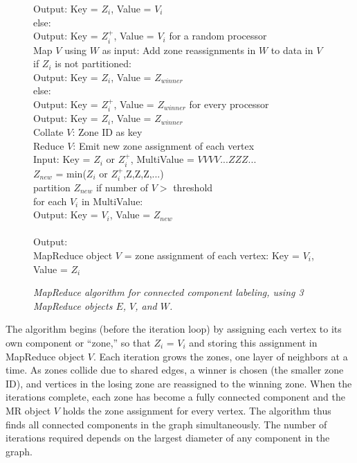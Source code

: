 \begin{figure}[htb]
\begin{center}
{\begin{minipage}{\textwidth}
\begin{tabbing}
    \> \> \> Output: Key = $Z_i$, Value = $V_i$ \\
    \> \> else: \\
    \> \> \> Output: Key = $Z_i^+$, Value = $V_i$ for a random processor \\
 Map $V$ using $W$ as input: Add zone reassignments in $W$ to data in $V$ \\
    \> \> if $Z_i$ is not partitioned: \\
    \> \> \> Output: Key = $Z_i$, Value = $Z_{winner}$ \\
    \> \> else: \\
    \> \> \> Output: Key = $Z_i^+$, Value = $Z_{winner}$ for every processor \\
    \> \> \> Output: Key = $Z_i$, Value = $Z_{winner}$ \\
 Collate $V$: Zone ID as key \\
 Reduce $V$: Emit new zone assignment of each vertex \\
       \> \> Input: Key = $Z_i$ or $Z_i^+$, MultiValue = $V V V V ... Z Z Z ...$ \\
       \> \> $Z_{new}$ = min($Z_i$ or $Z_i^+$,Z,Z,Z,...) \\
       \> \> partition $Z_{new}$ if number of $V >$ threshold \\
       \> \> for each $V_i$ in MultiValue: \\
       \> \> \> Output: Key = $V_i$, Value = $Z_{new}$ \\
\\
Output: \\
\> MapReduce object $V$ = zone assignment of each vertex: Key = $V_i$, Value = $Z_i$ 
  \end{tabbing}
 \end{minipage}}\end{center}

 \caption{\it MapReduce algorithm for connected component labeling,
 using 3 MapReduce objects $E$, $V$, and $W$.}

 \label{fig:cc}
\end{figure}

The algorithm begins (before the iteration loop) by assigning each
vertex to its own component or ``zone,'' so that $Z_i$ = $V_i$ and
storing this assignment in MapReduce object $V$.  Each iteration grows
the zones, one layer of neighbors at a time.  As zones collide due to
shared edges, a winner is chosen (the smaller zone ID), and vertices
in the losing zone are reassigned to the winning zone.  When the
iterations complete, each zone has become a fully connected component
and the MR object $V$ holds the zone assignment for every vertex.  The
algorithm thus finds all connected components in the graph
simultaneously.  The number of iterations required depends on the
largest diameter of any component in the graph.

